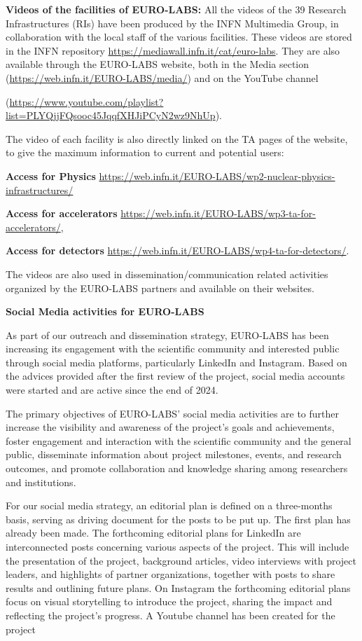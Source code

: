 \textbf{Videos of the facilities of EURO-LABS:}  
All the videos of the 39 Research Infrastructures (RIs) have been produced by the INFN Multimedia Group, in collaboration with the local staff of the various facilities. These videos are stored in the INFN repository \url{https://mediawall.infn.it/cat/euro-labs}. They are also available through the EURO-LABS website, both in the Media section (\url{https://web.infn.it/EURO-LABS/media/}) and on the YouTube channel 

(\url{https://www.youtube.com/playlist?list=PLYQjjFQsooc45JqqfXHJiPCyN2wz9NhUp}).
 
The video of each facility is also directly linked on the TA pages of the website, to give the maximum information to current and potential users:

\textbf{Access for Physics} \url{https://web.infn.it/EURO-LABS/wp2-nuclear-physics-infrastructures/}

\textbf{Access for accelerators} \url{https://web.infn.it/EURO-LABS/wp3-ta-for-accelerators/},

\textbf{Access for detectors} \url{https://web.infn.it/EURO-LABS/wp4-ta-for-detectors/}.

The videos are also used in dissemination/communication related activities organized by the  EURO-LABS partners and available on their websites.

\textbf{Social Media activities for EURO-LABS}

As part of our outreach and dissemination strategy, EURO-LABS has been increasing its engagement with the scientific community and interested public through social media platforms, particularly LinkedIn and Instagram. Based on the advices provided after the first review of the project, social media accounts were started and are active since the end of 2024.

The primary objectives of EURO-LABS' social media activities are to further increase the visibility and awareness of the project's goals and achievements, foster engagement and interaction with the scientific community and the general public, disseminate information about project milestones, events, and research outcomes, and promote collaboration and knowledge sharing among researchers and institutions.
  
For our social media strategy, an editorial plan is defined on a three-months basis, serving as driving document for the posts to be put up. The first plan has already been made. The forthcoming editorial plans for LinkedIn are interconnected posts concerning various aspects of the project. This will include the presentation of the project, background articles, video interviews with project leaders, and highlights of partner organizations, together with posts to share results and outlining future plans. On Instagram the forthcoming editorial plans focus on visual storytelling to introduce the project, sharing the impact and reflecting the project's progress.  
A Youtube channel has been created for the project

